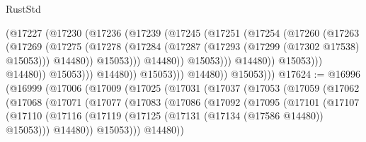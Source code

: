 \begin{lexlean}{RustStd}
\begin{coremodule}
                                      (@17227
                                        (@17230
                                          (@17236
                                            (@17239
                                              (@17245
                                                (@17251
                                                  (@17254
                                                    (@17260
                                                      (@17263
                                                        (@17269
                                                          (@17275
                                                            (@17278
                                                              (@17284
                                                                (@17287
                                                                  (@17293
                                                                    (@17299
                                                                      (@17302 @17538)
                                                                      @15053)))
                                                                @14480))
                                                            @15053)))
                                                      @14480))
                                                  @15053)))
                                            @14480))
                                        @15053)))
                                  @14480))
                              @15053)))
                        @14480))
                    @15053)))
              @14480))
          @15053)))
@17624 := @16996
    (@16999
      (@17006
        (@17009
          (@17025
            (@17031
              (@17037
                (@17053
                  (@17059
                    (@17062
                      (@17068
                        (@17071
                          (@17077
                            (@17083
                              (@17086
                                (@17092
                                  (@17095
                                    (@17101
                                      (@17107
                                        (@17110
                                          (@17116
                                            (@17119
                                              (@17125 (@17131 (@17134 (@17586 @14480)) @15053)))
                                            @14480))
                                        @15053)))
                                  @14480))

\end{coremodule}
\end{lexlean}
